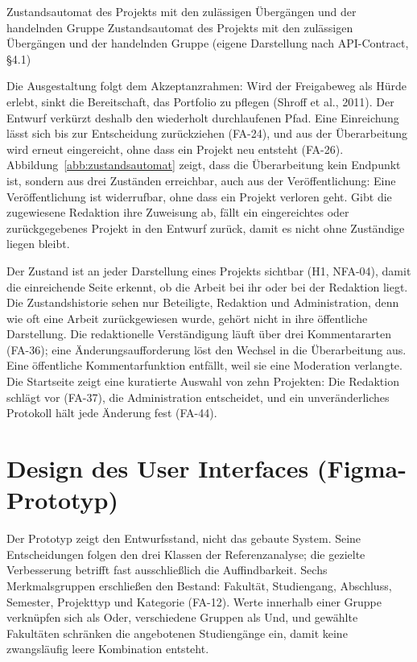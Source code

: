 %
{Zustandsautomat des Projekts mit den zulässigen Übergängen und der handelnden Gruppe}%
{Zustandsautomat des Projekts mit den zulässigen Übergängen und der handelnden Gruppe (eigene Darstellung nach API-Contract, §4.1)}

Die Ausgestaltung folgt dem Akzeptanzrahmen: Wird der Freigabeweg als Hürde erlebt, sinkt die Bereitschaft, das Portfolio zu pflegen (Shroff et al., 2011). Der Entwurf verkürzt deshalb den wiederholt durchlaufenen Pfad. Eine Einreichung lässt sich bis zur Entscheidung zurückziehen (FA-24), und aus der Überarbeitung wird erneut eingereicht, ohne dass ein Projekt neu entsteht (FA-26). Abbildung~\ref{abb:zustandsautomat} zeigt, dass die Überarbeitung kein Endpunkt ist, sondern aus drei Zuständen erreichbar, auch aus der Veröffentlichung: Eine Veröffentlichung ist widerrufbar, ohne dass ein Projekt verloren geht. Gibt die zugewiesene Redaktion ihre Zuweisung ab, fällt ein eingereichtes oder zurückgegebenes Projekt in den Entwurf zurück, damit es nicht ohne Zuständige liegen bleibt.

Der Zustand ist an jeder Darstellung eines Projekts sichtbar (H1, NFA-04), damit die einreichende Seite erkennt, ob die Arbeit bei ihr oder bei der Redaktion liegt. Die Zustandshistorie sehen nur Beteiligte, Redaktion und Administration, denn wie oft eine Arbeit zurückgewiesen wurde, gehört nicht in ihre öffentliche Darstellung. Die redaktionelle Verständigung läuft über drei Kommentararten (FA-36); eine Änderungsaufforderung löst den Wechsel in die Überarbeitung aus. Eine öffentliche Kommentarfunktion entfällt, weil sie eine Moderation verlangte. Die Startseite zeigt eine kuratierte Auswahl von zehn Projekten: Die Redaktion schlägt vor (FA-37), die Administration entscheidet, und ein unveränderliches Protokoll hält jede Änderung fest (FA-44).

\section{Design des User Interfaces (Figma-Prototyp)}
\label{sec:ui-design}

Der Prototyp zeigt den Entwurfsstand, nicht das gebaute System. Seine Entscheidungen folgen den drei Klassen der Referenzanalyse; die gezielte Verbesserung betrifft fast ausschließlich die Auffindbarkeit. Sechs Merkmalsgruppen erschließen den Bestand: Fakultät, Studiengang, Abschluss, Semester, Projekttyp und Kategorie (FA-12). Werte innerhalb einer Gruppe verknüpfen sich als Oder, verschiedene Gruppen als Und, und gewählte Fakultäten schränken die angebotenen Studiengänge ein, damit keine zwangsläufig leere Kombination entsteht.

